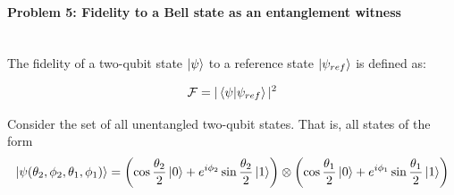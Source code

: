 \documentclass[12pt]{article}
\begin{document}
\paragraph{Problem 5: Fidelity to a Bell state as an entanglement witness} \hfill \\

The fidelity of a two-qubit state $\ket{\psi}$ to a reference state $\ket{\psi_{ref}}$ is defined as:

\begin{align*}
    \mathcal{F} = |\braket{\psi|\psi_{ref}}|^2
\end{align*}

Consider the set of all unentangled two-qubit states. That is, all states of the form
\begin{align*}
    \ket{\psi(\theta_2, \phi_2, \theta_1, \phi_1)} =
        \left(\cos{\frac{\theta_2}{2}}\ket{0} + e^{i\phi_2}\sin{\frac{\theta_2}{2}}\ket{1}\right) \otimes
        \left(\cos{\frac{\theta_1}{2}}\ket{0} + e^{i\phi_1}\sin{\frac{\theta_1}{2}}\ket{1}\right)
\end{align*}
\end{document}
